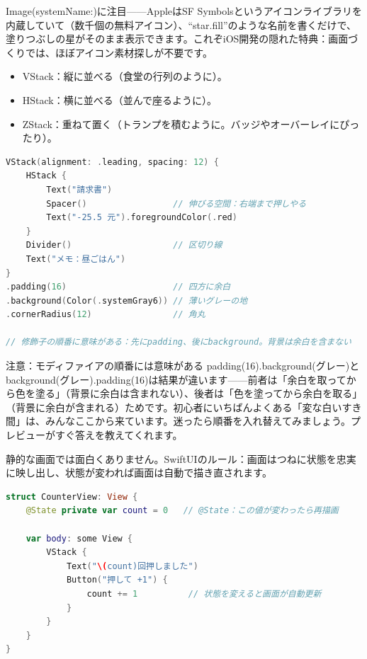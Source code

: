Image(systemName:)に注目——AppleはSF Symbolsというアイコンライブラリを内蔵していて（数千個の無料アイコン）、“star.fill”のような名前を書くだけで、塗りつぶしの星がそのまま表示できます。これぞiOS開発の隠れた特典：画面づくりでは、ほぼアイコン素材探しが不要です。


\begin{itemize}
  \item VStack：縦に並べる（食堂の行列のように）。
  \item HStack：横に並べる（並んで座るように）。
  \item ZStack：重ねて置く（トランプを積むように。バッジやオーバーレイにぴったり）。
\end{itemize}

\begin{lstlisting}[language=Swift]
VStack(alignment: .leading, spacing: 12) {
    HStack {
        Text("請求書")
        Spacer()                 // 伸びる空間：右端まで押しやる
        Text("-25.5 元").foregroundColor(.red)
    }
    Divider()                    // 区切り線
    Text("メモ：昼ごはん")
}
.padding(16)                     // 四方に余白
.background(Color(.systemGray6)) // 薄いグレーの地
.cornerRadius(12)                // 角丸

// 修飾子の順番に意味がある：先にpadding、後にbackground。背景は余白を含まない
\end{lstlisting}

\begin{tcbwarn}{注意：モディファイアの順番には意味がある}
padding(16).background(グレー)とbackground(グレー).padding(16)は結果が違います——前者は「余白を取ってから色を塗る」（背景に余白は含まれない）、後者は「色を塗ってから余白を取る」（背景に余白が含まれる）ためです。初心者にいちばんよくある「変な白いすき間」は、みんなここから来ています。迷ったら順番を入れ替えてみましょう。プレビューがすぐ答えを教えてくれます。

\end{tcbwarn}


静的な画面では面白くありません。SwiftUIのルール：画面はつねに状態を忠実に映し出し、状態が変われば画面は自動で描き直されます。

\begin{lstlisting}[language=Swift]
struct CounterView: View {
    @State private var count = 0   // @State：この値が変わったら再描画

    var body: some View {
        VStack {
            Text("\(count)回押しました")
            Button("押して +1") {
                count += 1          // 状態を変えると画面が自動更新
            }
        }
    }
}
\end{lstlisting}

